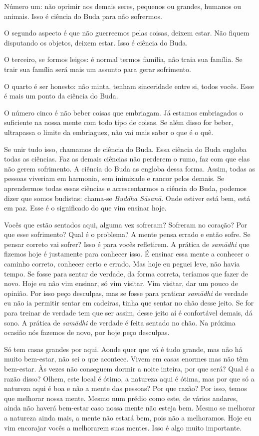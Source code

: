 Número um: não oprimir aos demais seres, pequenos ou grandes,
humanos ou animais. Isso é ciência do Buda para não sofrermos.

O segundo aspecto é que não guerreemos pelas coisas, deixem estar.
Não fiquem disputando os objetos, deixem estar. Isso é ciência do Buda.

O terceiro, se formos leigos: é normal termos família, não traia sua
família. Se trair sua família será mais um assunto para gerar
sofrimento.

O quarto é ser honesto: não minta, tenham sinceridade entre si,
todos vocês. Esse é mais um ponto da ciência do Buda.

O número cinco é não beber coisas que embriagam. Já estamos
embriagados o suficiente na nossa mente com todo tipo de coisas. Se
além disso for beber, ultrapassa o limite da embriaguez, não vai mais
saber o que é o quê. 

Se unir tudo isso, chamamos de ciência do Buda. Essa ciência do Buda
engloba todas as ciências. Faz as demais ciências não perderem o rumo,
faz com que elas não gerem sofrimento. A ciência do Buda as engloba
dessa forma. Assim, todas as pessoas viveriam em harmonia, sem
inimizade e rancor pelos demais. Se aprendermos todas essas ciências e
acrescentarmos a ciência do Buda, podemos dizer que somos budistas:
chama-se \emph{Buddha Sāsanā}. Onde estiver está bem, está em paz.
Esse é o significado do que vim ensinar hoje.

Vocês que estão sentados aqui, alguma vez sofreram? Sofreram no
coração? Por que esse sofrimento? Qual é o problema? A mente pensa
errado e então sofre. Se pensar correto vai sofrer? Isso é para vocês
refletirem. A prática de \emph{samādhi} que fizemos hoje é
justamente para conhecer isso. É ensinar essa mente a conhecer o
caminho correto, conhecer certo e errado. Mas hoje eu peguei leve, não
havia tempo. Se fosse para sentar de verdade, da forma correta,
teríamos que fazer de novo. Hoje eu não vim ensinar, só vim visitar.
Vim visitar, dar um pouco de opinião. Por isso peço desculpas, mas se
fosse para praticar \emph{samādhi} de verdade eu não ia permitir
sentar em cadeiras, tinha que sentar no chão desse jeito. Se for para
treinar de verdade tem que ser assim, desse jeito aí é confortável
demais, dá sono. A prática de \emph{samādhi} de verdade é feita
sentado no chão. Na próxima ocasião nós fazemos de novo, por hoje peço
desculpas.

Só tem casas grandes por aqui. Aonde quer que vá é tudo grande, mas
não há muito bem-estar, não sei o que acontece. Vivem em casas enormes
mas não têm bem-estar. Às vezes não conseguem dormir a noite inteira,
por que será? Qual é a razão disso? Olhem, este local é ótimo, a
natureza aqui é ótima, mas por que só a natureza aqui é boa e não a
mente das pessoas? Por que razão? Por isso, temos que melhorar nossa
mente. Mesmo num prédio como este, de vários andares, ainda não haverá
bem-estar caso nossa mente não esteja bem. Mesmo se melhorar a natureza
ainda mais, a mente não estará bem, pois não a melhoramos. Hoje eu vim
encorajar vocês a melhorarem suas mentes. Isso é algo muito importante.


